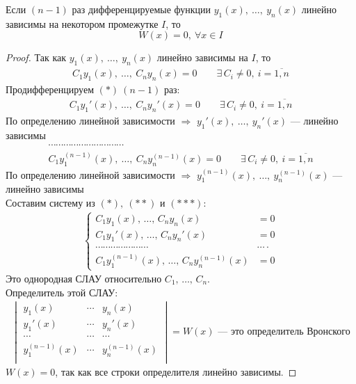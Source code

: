 \begin{theorem*}
    Если $(n-1)$ раз дифференцируемые функции $y_1(x),\ \ldots,\ y_n(x)$ линейно зависимы на некотором промежутке $I$, то
    \[
        W(x) = 0,\ \forall x \in I
    \]
\end{theorem*}
\begin{proof}
    Так как $y_1(x),\ \ldots,\ y_n(x)$ линейно зависимы на $I$, то
    \begin{gather*}
        \boxed{C_1 y_1(x),\ \ldots,\ C_n y_n(x) = 0}\qquad \exists\, C_i \ne 0,\ i = \overline{1,n} \tag{$*$}
    \end{gather*}
    Продифференцируем $(*)\ (n-1)$ раз:
    \begin{gather*}
        \boxed{C_1 y_1'(x),\ \ldots,\ C_n y_n'(x) = 0}\qquad \exists\, C_i \ne 0,\ i = \overline{1,n} \tag{$**$}
    \end{gather*}
    По определению линейной зависимости $\Rightarrow$ $y_1'(x),\ \ldots,\ y_n'(x)$ --- линейно зависимы
    \begin{gather*}
        \cdots\cdots\cdots\cdots\cdots\cdots\cdots\cdots\cdots\cdots \\
        \boxed{C_1 y_1^{(n-1)}(x),\ \ldots,\ C_n y_n^{(n-1)}(x) = 0}\qquad \exists\, C_i \ne 0,\ i = \overline{1,n} \tag{$***$}
    \end{gather*}    
    По определению линейной зависимости $\Rightarrow$ $y_1^{(n-1)}(x),\ \ldots,\ y_n^{(n-1)}(x)$ --- линейно зависимы \\
    Составим систему из $(*),\ (**)$ и $(***)$:
    \begin{gather*}
        \left\{ \begin{aligned}
            C_1 y_1(x),\, \ldots,\, C_n y_n(x) &= 0 \\
            C_1 y_1'(x),\, \ldots,\, C_n y_n'(x) &= 0 \\
            \cdots\cdots\cdots\cdots\cdots\cdots\cdots&\cdots\cdot \\
            C_1 y_1^{(n-1)}(x),\, \ldots,\, C_n y_n^{(n-1)}(x) &= 0
        \end{aligned} \right.
    \end{gather*}
    Это однородная СЛАУ относительно $C_1,\, \ldots,\, C_n$. \\
    Определитель этой СЛАУ:
    \begin{gather*}
        \begin{vmatrix}
            y_1(x) & \cdots & y_n(x) \\
            y_1'(x) & \cdots & y_n'(x) \\
            \cdots & \cdots & \cdots \\
            y_1^{(n-1)}(x) & \cdots & y_n^{(n-1)}(x) \\
        \end{vmatrix} = W(x) \text{ --- это определитель Вронского}
    \end{gather*}
    $W(x) = 0$, так как все строки определителя линейно зависимы.
\end{proof}

